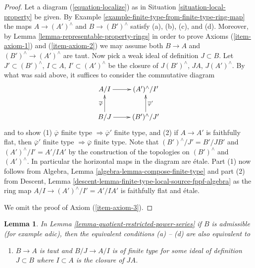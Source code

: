 \documentclass{stacks-project}
\theoremstyle{plain}
\newtheorem{lemma}[subsection]{Lemma}
\theoremstyle{definition}
\theoremstyle{remark}
\numberwithin{equation}{subsection}
\begin{document}
\begin{proof}
\medskip\noindent
Let a diagram (\ref{equation-localize}) as in
Situation \ref{situation-local-property}
be given. By Example \ref{example-finite-type-from-finite-type-ring-map}
the maps $A \to (A')^\wedge$ and $B \to (B')^\wedge$
satisfy (a), (b), (c), and (d). Moreover, by
Lemma \ref{lemma-representable-property-rings}
in order to prove Axioms (\ref{item-axiom-1}) and (\ref{item-axiom-2})
we may assume both $B \to A$ and $(B')^\wedge \to (A')^\wedge$
are taut. Now pick a weak ideal of definition $J \subset B$. Let
$J' \subset (B')^\wedge$, $I \subset A$, $I' \subset (A')^\wedge$
be the closure of $J(B')^\wedge$, $JA$, $J(A')^\wedge$.
By what was said above, it suffices to consider the commutative
diagram
$$
\xymatrix{
A/I \ar[r] & (A')^\wedge/I' \\
B/J \ar[r] \ar[u]^{\overline{\varphi}} &
(B')^\wedge/J' \ar[u]_{\overline{\varphi}'}
}
$$
and to show (1) $\overline{\varphi}$ finite type
$\Rightarrow \overline{\varphi}'$
finite type, and (2) if $A \to A'$ is faithfully flat, then
$\overline{\varphi}'$ finite type $\Rightarrow \overline{\varphi}$
finite type. Note that $(B')^\wedge/J' = B'/JB'$ and
$(A')^\wedge/I' = A'/IA'$ by the construction of the topologies on
$(B')^\wedge$ and $(A')^\wedge$. In particular the horizontal
maps in the diagram are \'etale. Part (1) now follows from
Algebra, Lemma \ref{algebra-lemma-compose-finite-type}
and part (2) from
Descent, Lemma \ref{descent-lemma-finite-type-local-source-fppf-algebra}
as the ring map $A/I \to (A')^\wedge/I' = A'/IA'$ is faithfully flat
and \'etale.

\medskip\noindent
We omit the proof of Axiom (\ref{item-axiom-3}).
\end{proof}

\begin{lemma}
\label{lemma-quotient-restricted-power-series-admissible}
In Lemma \ref{lemma-quotient-restricted-power-series}
if $B$ is admissible (for example adic), then the equivalent conditions
(a) -- (d) are also equivalent to
\begin{enumerate}
\item[(e)] $B \to A$ is taut and $B/J \to A/I$ is of finite type for
some ideal of definition $J \subset B$ where $I \subset A$ is
the closure of $JA$.
\end{enumerate}
\end{lemma}
\end{document}
